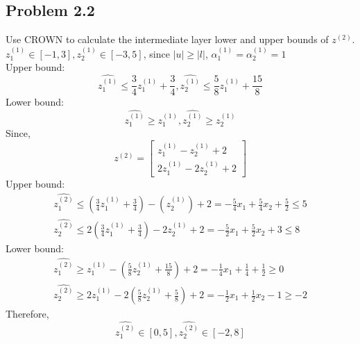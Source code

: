 \documentclass{article}
\begin{document}
\subsection{Problem 2.2}
Use CROWN to calculate the intermediate layer lower and upper bounds of $z^{(2)}$.\\
$z^{(1)}_1 \in [-1, 3], z^{(1)}_2 \in [-3, 5]$, since $|u|\geq|l|$, $\alpha^{(1)}_1 = \alpha^{(1)}_2 = 1$\\
Upper bound:\\
\begin{equation}
    \hat{z^{(1)}_1} \leq \frac{3}{4}z^{(1)}_1 + \frac{3}{4}, \hat{z^{(1)}_2} \leq \frac{5}{8}z^{(1)}_1 + \frac{15}{8}
\end{equation}
Lower bound:\\
\begin{equation}
    \hat{z^{(1)}_1} \geq z^{(1)}_1, \hat{z^{(1)}_2} \geq z^{(1)}_2
\end{equation}
Since,
\begin{equation}
    z^{(2)} = \begin{bmatrix}z^{(1)}_1 - z^{(1)}_2 + 2 \\ 2z^{(1)}_1 - 2z^{(1)}_2 +2 \end{bmatrix}
\end{equation}
Upper bound:\\
\begin{align}
    \hat{z^{(2)}_1} \leq (\frac{3}{4}z^{(1)}_1 + \frac{3}{4}) - (z^{(1)}_2) +2 = -\frac{5}{4}x_1 + \frac{5}{4}x_2 +\frac{5}{2} \leq 5\\
    \hat{z^{(2)}_2} \leq 2(\frac{3}{4}z^{(1)}_1 + \frac{3}{4}) - 2z^{(1)}_2 +2 = -\frac{5}{2}x_1 + \frac{5}{2}x_2 +3 \leq 8
\end{align}
Lower bound:\\
\begin{align}
    \hat{z^{(2)}_1} \geq z^{(1)}_1 - (\frac{5}{8}z^{(1)}_2 + \frac{15}{8}) + 2 = -\frac{1}{4}x_1 + \frac{1}{4} + \frac{1}{2} \geq 0\\
    \hat{z^{(2)}_2} \geq 2z^{(1)}_1 - 2(\frac{5}{8}z^{(1)}_2 + \frac{5}{8}) +2 = -\frac{1}{2}x_1 + \frac{1}{2}x_2 - 1 \geq -2 
\end{align}
Therefore,
\begin{equation}
    \hat{z^{(2)}_1} \in [0,5], \hat{z^{(2)}_2} \in [-2,8]
\end{equation}
\end{document}
